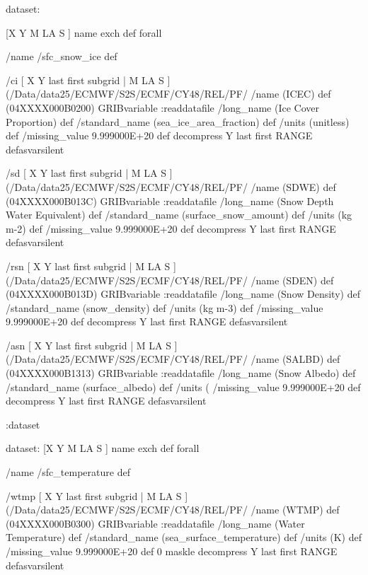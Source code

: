 \begin{ingrid}

dataset:

[X Y M LA S ] {name exch def } forall

/name /sfc_snow_ice def


/ci { [ X Y last first subgrid | M LA S ] (/Data/data25/ECMWF/S2S/ECMF/CY48/REL/PF/%
/name (ICEC) def
(04XXXX000B0200) GRIBvariable
:readdatafile
/long_name (Ice Cover Proportion) def
/standard_name (sea_ice_area_fraction) def
/units (unitless) def
/missing_value 9.999000E+20 def
decompress
Y last first RANGE
} defasvarsilent


/sd { [ X Y last first subgrid | M LA S ] (/Data/data25/ECMWF/S2S/ECMF/CY48/REL/PF/%
/name (SDWE) def
(04XXXX000B013C) GRIBvariable
:readdatafile
/long_name (Snow Depth Water Equivalent) def
/standard_name (surface_snow_amount) def
/units (kg m-2) def
/missing_value 9.999000E+20 def
decompress
Y last first RANGE
} defasvarsilent


/rsn { [ X Y last first subgrid | M LA S ] (/Data/data25/ECMWF/S2S/ECMF/CY48/REL/PF/%
/name (SDEN) def
(04XXXX000B013D) GRIBvariable
:readdatafile
/long_name (Snow Density) def
/standard_name (snow_density) def
/units (kg m-3) def
/missing_value 9.999000E+20 def
decompress
Y last first RANGE
} defasvarsilent


/asn { [ X Y last first subgrid | M LA S ] (/Data/data25/ECMWF/S2S/ECMF/CY48/REL/PF/%
/name (SALBD) def
(04XXXX000B1313) GRIBvariable
:readdatafile
/long_name (Snow Albedo) def
/standard_name (surface_albedo) def
/units (%
/missing_value 9.999000E+20 def
decompress
Y last first RANGE
} defasvarsilent

:dataset

dataset:
[X Y M LA S ] {name exch def } forall

/name /sfc_temperature def


/wtmp { [ X Y last first subgrid | M LA S ] (/Data/data25/ECMWF/S2S/ECMF/CY48/REL/PF/%
/name (WTMP) def
(04XXXX000B0300) GRIBvariable
:readdatafile
/long_name (Water Temperature) def
/standard_name (sea_surface_temperature) def
/units (K) def
/missing_value 9.999000E+20 def
0 maskle
decompress
Y last first RANGE
} defasvarsilent



\end{ingrid}
